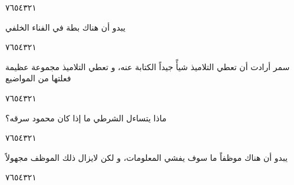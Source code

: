 \documentclass[11pt, a4paper]{article}
\begin{document}
{\begin{center}
        \hfill\textarabic{٧}\hfill\textarabic{٦}\hfill\textarabic{٥}\hfill\textarabic{٤}\hfill\textarabic{٣}\hfill\textarabic{٢}\hfill\textarabic{١}
        \end{center}


\vspace{0.5\baselineskip}\begin{flushright}
\textarabic{يبدو أن هناك بطة في الفناء الخلفي}
\end{flushright}

\begin{center}
        \hfill\textarabic{٧}\hfill\textarabic{٦}\hfill\textarabic{٥}\hfill\textarabic{٤}\hfill\textarabic{٣}\hfill\textarabic{٢}\hfill\textarabic{١}
        \end{center}


\vspace{0.5\baselineskip}\begin{flushright}
\textarabic{سمر أرادت أن تعطي التلاميذ شيأً جيداً الكتابة عنه، و تعطي التلاميذ مجموعة عظيمة فعلتها من المواضيع}
\end{flushright}

\begin{center}
        \hfill\textarabic{٧}\hfill\textarabic{٦}\hfill\textarabic{٥}\hfill\textarabic{٤}\hfill\textarabic{٣}\hfill\textarabic{٢}\hfill\textarabic{١}
        \end{center}


\vspace{0.5\baselineskip}\begin{flushright}
\textarabic{ماذا يتساءل الشرطي ما إذا كان محمود سرقه؟}
\end{flushright}

\begin{center}
        \hfill\textarabic{٧}\hfill\textarabic{٦}\hfill\textarabic{٥}\hfill\textarabic{٤}\hfill\textarabic{٣}\hfill\textarabic{٢}\hfill\textarabic{١}
        \end{center}


\vspace{0.5\baselineskip}\begin{flushright}
\textarabic{يبدو أن هناك موظفاً ما سوف يفشي المعلومات، و لكن لايزال ذلك الموظف مجهولاً}
\end{flushright}

\begin{center}
        \hfill\textarabic{٧}\hfill\textarabic{٦}\hfill\textarabic{٥}\hfill\textarabic{٤}\hfill\textarabic{٣}\hfill\textarabic{٢}\hfill\textarabic{١}
        \end{center}


}
\end{document}
